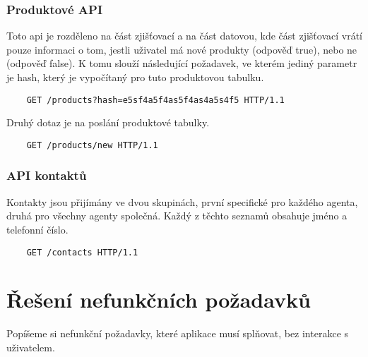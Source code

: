 \documentclass[11pt,twoside,a4paper]{book}
\begin{document}
\subsubsection{Produktové API} \label{sec:productsAPI}
Toto api je rozděleno na část zjišťovací a na část datovou, kde část zjišťovací vrátí pouze informaci o tom, jestli uživatel má nové produkty (odpověď true), nebo ne (odpověď false). K tomu slouží následující požadavek, ve kterém jediný parametr je hash, který je vypočítaný pro tuto produktovou tabulku.

\begin{minipage}{\linewidth}
\begin{verbatim}
	GET /products?hash=e5sf4a5f4as5f4as4a5s4f5 HTTP/1.1
\end{verbatim}
\end{minipage}

Druhý dotaz je na poslání produktové tabulky.

\begin{minipage}{\linewidth}
\begin{verbatim}
	GET /products/new HTTP/1.1
\end{verbatim}


\end{minipage}

\subsubsection{API kontaktů} \label{sec:contactsAPI}
Kontakty jsou přijímány ve dvou skupinách, první specifické pro každého agenta, druhá pro všechny agenty společná. Každý z těchto seznamů obsahuje jméno a telefonní číslo. 

\begin{minipage}{\linewidth}
\begin{verbatim}
	GET /contacts HTTP/1.1
\end{verbatim}


\end{minipage}

\section{Řešení nefunkčních požadavků}
Popíšeme si nefunkční požadavky, které aplikace musí splňovat, bez interakce s uživatelem.
\end{document}
